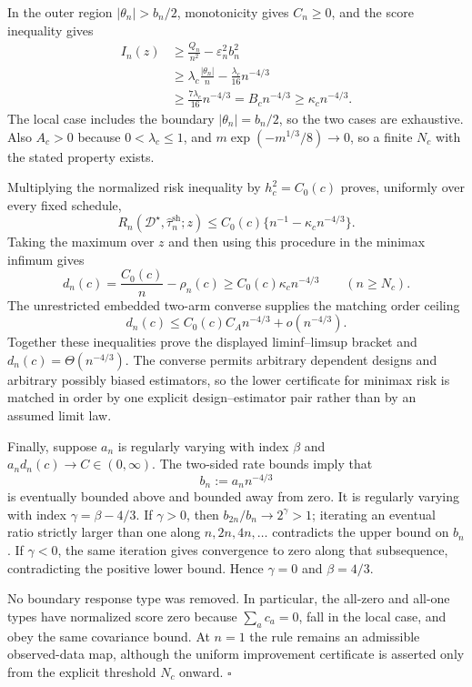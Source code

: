In the outer region \(|\theta_n|>b_n/2\), monotonicity gives \(C_n\geq0\), and the score inequality gives
\[
 \begin{aligned}
 I_n(z)
 &\geq\frac{Q_n}{n^2}-\varepsilon_n^2b_n^2\\
 &\geq\lambda_c\frac{|\theta_n|}{n}-\frac{\lambda_c}{16}n^{-4/3}\\
 &\geq\frac{7\lambda_c}{16}n^{-4/3}
 =B_cn^{-4/3}
 \geq\kappa_cn^{-4/3}.
 \end{aligned}
\]
The local case includes the boundary \(|\theta_n|=b_n/2\), so the two cases are exhaustive. Also \(A_c>0\) because \(0<\lambda_c\leq1\), and \(m\exp(-m^{1/3}/8)\to0\), so a finite \(N_c\) with the stated property exists.

Multiplying the normalized risk inequality by \(h_c^2=C_0(c)\) proves, uniformly over every fixed schedule,
\[
 R_n(\mathcal D^\star,\widehat\tau_n^{\mathrm{sh}};z)
 \leq C_0(c)\{n^{-1}-\kappa_cn^{-4/3}\}.
\]
Taking the maximum over \(z\) and then using this procedure in the minimax infimum gives
\[
 d_n(c)=\frac{C_0(c)}n-\rho_n(c)
 \geq C_0(c)\kappa_cn^{-4/3}
 \qquad(n\geq N_c).
\]
The unrestricted embedded two-arm converse supplies the matching order ceiling
\[
 d_n(c)\leq C_0(c)C_A n^{-4/3}+o(n^{-4/3}).
\]
Together these inequalities prove the displayed liminf--limsup bracket and \(d_n(c)=\Theta(n^{-4/3})\). The converse permits arbitrary dependent designs and arbitrary possibly biased estimators, so the lower certificate for minimax risk is matched in order by one explicit design--estimator pair rather than by an assumed limit law.

Finally, suppose \(a_n\) is regularly varying with index \(\beta\) and \(a_nd_n(c)\to C\in(0,\infty)\). The two-sided rate bounds imply that
\[
 b_n:=a_nn^{-4/3}
\]
is eventually bounded above and bounded away from zero. It is regularly varying with index \(\gamma=\beta-4/3\). If \(\gamma>0\), then \(b_{2n}/b_n\to2^\gamma>1\); iterating an eventual ratio strictly larger than one along \(n,2n,4n,\ldots\) contradicts the upper bound on \(b_n\). If \(\gamma<0\), the same iteration gives convergence to zero along that subsequence, contradicting the positive lower bound. Hence \(\gamma=0\) and \(\beta=4/3\).

No boundary response type was removed. In particular, the all-zero and all-one types have normalized score zero because \(\sum_ac_a=0\), fall in the local case, and obey the same covariance bound. At \(n=1\) the rule remains an admissible observed-data map, although the uniform improvement certificate is asserted only from the explicit threshold \(N_c\) onward. \(\square\)